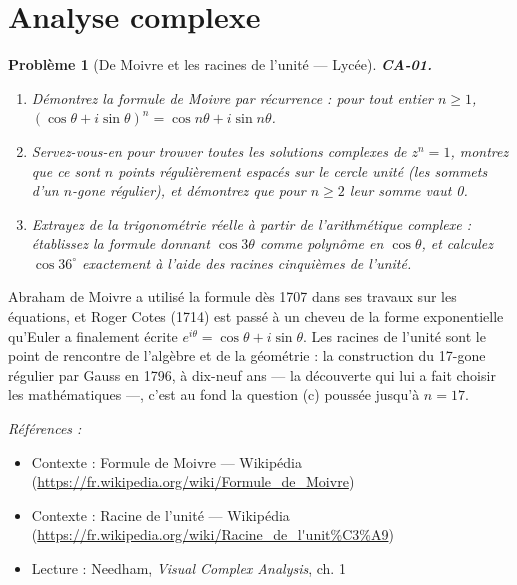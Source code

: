 \documentclass[11pt]{article}
\newtheorem{problem}{Problème}
\newenvironment{refs}{\par\small\noindent\emph{Références :}\begin{itemize}\setlength\itemsep{0pt}}{\end{itemize}\normalsize}
\begin{document}
\bigskip


\section*{Analyse complexe}

\begin{problem}[{De Moivre et les racines de l'unité --- Lycée}]
\textbf{CA-01.} \begin{enumerate}
\item[(a)] Démontrez la formule de Moivre par récurrence : pour tout
entier $ n \ge 1 $,
$ (\cos\theta + i\sin\theta)^n = \cos n\theta + i\sin n\theta $.
\item[(b)] Servez-vous-en pour trouver toutes les solutions complexes de $ z^n = 1 $, montrez que ce sont
$ n $ points régulièrement espacés sur le cercle unité (les sommets d'un $ n $-gone régulier), et
démontrez que pour $ n \ge 2 $ leur somme vaut 0.
\item[(c)] Extrayez de la trigonométrie réelle à partir de l'arithmétique complexe : établissez
la formule donnant $ \cos 3\theta $ comme polynôme en $ \cos\theta $, et calculez
$ \cos 36^\circ $ exactement à l'aide des racines cinquièmes de l'unité.
\end{enumerate}

\end{problem}

\noindent Abraham de Moivre a utilisé la formule dès 1707 dans ses travaux sur les
équations, et Roger Cotes (1714) est passé à un cheveu de la forme exponentielle qu'Euler a
finalement écrite $ e^{i\theta} = \cos\theta + i\sin\theta $. Les racines de l'unité sont le point
de rencontre de l'algèbre et de la géométrie : la construction du 17-gone régulier par Gauss en
1796, à dix-neuf ans --- la découverte qui lui a fait choisir les mathématiques ---, c'est au fond la
question (c) poussée jusqu'à $ n = 17 $.

\begin{refs}
\item Contexte : Formule de Moivre --- Wikipédia (\url{https://fr.wikipedia.org/wiki/Formule_de_Moivre})
\item Contexte : Racine de l'unité --- Wikipédia (\url{https://fr.wikipedia.org/wiki/Racine_de_l'unit%C3%A9})
\item Lecture : Needham, \textit{Visual Complex Analysis}, ch. 1
\end{refs}

\bigskip
\end{document}
